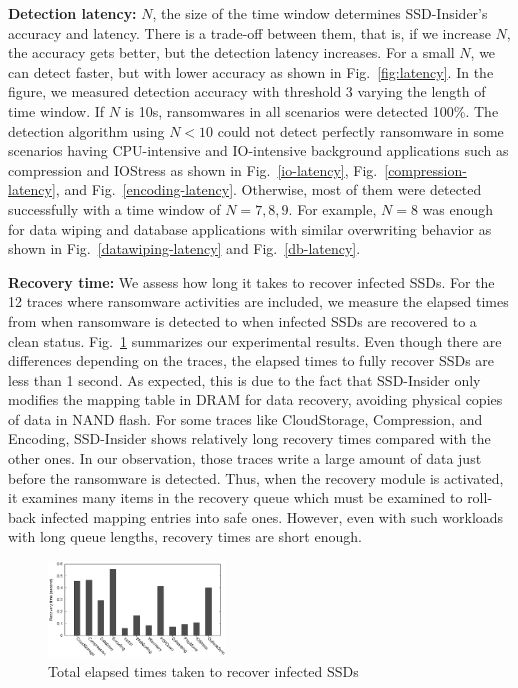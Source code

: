 \documentclass[conference]{IEEEtran}
\newcommand{\ours}{SSD-Insider}
\begin{document}
{\noindent\bf Detection latency:}
$N$, the size of the time window determines \ours{}'s accuracy and latency. 
There is a trade-off between them, that is, if we increase $N$, the accuracy gets better, but the detection latency
increases. For a small $N$, we can detect faster, but with lower accuracy as shown in Fig.~\ref{fig:latency}. 
In the figure, we measured detection accuracy with threshold 3 varying the length of time window. 
If $N$ is 10s, ransomwares in all scenarios were detected 100\%. 
The detection algorithm using $N<10$ could not detect perfectly ransomware in some scenarios having 
CPU-intensive and IO-intensive background applications such as compression and IOStress as shown in 
Fig.~\ref{io-latency}, Fig.~\ref{compression-latency}, and Fig.~\ref{encoding-latency}. 
Otherwise, most of them were detected successfully with a time window of $N=7,8,9$.
For example, $N=8$ was enough for data wiping and database applications with similar overwriting behavior
as shown in Fig.~\ref{datawiping-latency} and Fig.~\ref{db-latency}. 

{\noindent\bf Recovery time:}
We assess how long it takes to recover infected SSDs. For the 12
traces where ransomware activities are included, we measure the
elapsed times from when ransomware is detected to when infected
SSDs are recovered to a clean status. Fig.~\ref{fig:flash-recovery}
summarizes our experimental results. Even though there are
differences depending on the traces, the elapsed times to fully
recover SSDs are less than 1 second. As expected, this is due to
the fact that \ours{} only modifies the mapping table in DRAM
for data recovery, avoiding physical copies of data in NAND flash.
For some traces like CloudStorage, Compression, and Encoding, \ours{}
shows relatively long recovery times compared with the other ones.
In our observation, those traces write a large amount of data just
before the ransomware is detected. Thus, when the recovery module
is activated, it examines many items in the recovery queue which must
be examined to roll-back infected mapping entries into safe ones.
However, even with such workloads with long queue lengths, recovery
times are short enough.

\begin{figure}[t] 
	\centering 
	\includegraphics[width=0.42\textwidth]{exp/recovery/fig}
	\caption{Total elapsed times taken to recover infected SSDs} 
	\label{fig:flash-recovery} 
\end{figure}
\end{document}
